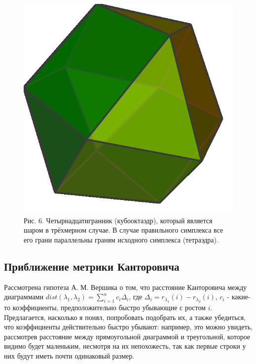 \documentclass[12pt]{report}
\begin{document}
\begin{figure}[!ht]
\begin{center}
\includegraphics[scale=0.4]{14surf}
\\Рис. 6. Четырнадцатигранник (кубооктаэдр), который является шаром в трёхмерном случае. В случае правильного симплекса все его грани параллельны граням исходного симплекса (тетраэдра).
\end{center}
\end{figure}

\newpage
\subsection*{Приближение метрики Канторовича}
\hspace{\parindent} Рассмотрена гипотеза А. М. Вершика о том, что расстояние Канторовича между диаграммами $dist(\lambda_1, \lambda_2) = \sum\limits_{i = 1}^n c_i\Delta_i$, где $\Delta_i = r_{\lambda_1}(i) - r_{\lambda_2}(i)$, $c_i$ - какие-то коэффициенты, предположительно быстро убывающие с ростом $i$. Предлагается, насколько я понял, попробовать подобрать их, а также убедиться, что коэффициенты действительно быстро убывают:  например, это можно увидеть, рассмотрев расстояние между прямоугольной диаграммой и треугольной, которое видимо будет маленьким, несмотря на их непохожесть, так как первые строки у них будут иметь почти одинаковый размер. 
\end{document}

